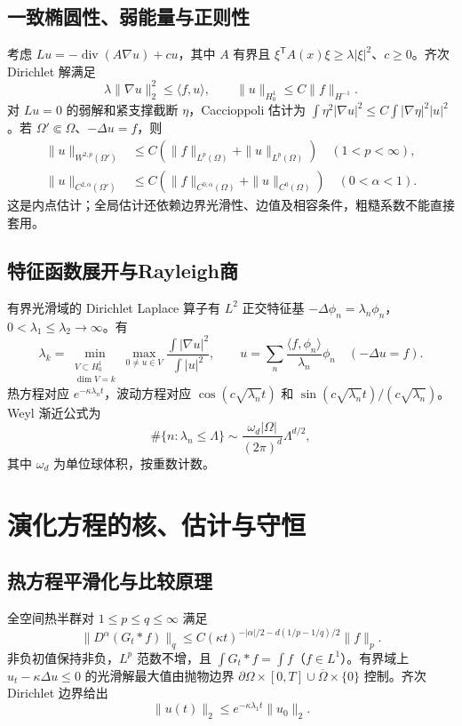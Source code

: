 \documentclass[../main.tex]{subfiles}
\begin{document}
\subsection{一致椭圆性、弱能量与正则性}
考虑 $Lu=-\operatorname{div}(A\nabla u)+cu$，其中 $A$ 有界且 $\xi^{\mathsf T}A(x)\xi\ge\lambda|\xi|^2$、$c\ge0$。齐次 Dirichlet 解满足
\[
\lambda\|\nabla u\|_2^2\le\langle f,u\rangle,\qquad
\|u\|_{H_0^1}\le C\|f\|_{H^{-1}}.
\]
对 $Lu=0$ 的弱解和紧支撑截断 $\eta$，Caccioppoli 估计为 $\int\eta^2|\nabla u|^2\le C\int|\nabla\eta|^2|u|^2$。若 $\Omega'\Subset\Omega$、$-\Delta u=f$，则
\begin{align*}
\|u\|_{W^{2,p}(\Omega')}&\le C(\|f\|_{L^p(\Omega)}+\|u\|_{L^p(\Omega)})\quad(1<p<\infty),\\
\|u\|_{C^{2,\alpha}(\Omega')}&\le C(\|f\|_{C^{0,\alpha}(\Omega)}+\|u\|_{C^0(\Omega)})\quad(0<\alpha<1).
\end{align*}
这是内点估计；全局估计还依赖边界光滑性、边值及相容条件，粗糙系数不能直接套用。
\subsection{特征函数展开与Rayleigh商}
有界光滑域的 Dirichlet Laplace 算子有 $L^2$ 正交特征基 $-\Delta\phi_n=\lambda_n\phi_n$，$0<\lambda_1\le\lambda_2\to\infty$。有
\[
\lambda_k=\min_{\substack{V\subset H_0^1\\\dim V=k}}\max_{0\ne u\in V}
\frac{\int|\nabla u|^2}{\int|u|^2},\qquad
u=\sum_n\frac{\langle f,\phi_n\rangle}{\lambda_n}\phi_n\quad(-\Delta u=f).
\]
热方程对应 $e^{-\kappa\lambda_nt}$，波动方程对应 $\cos(c\sqrt{\lambda_n}t)$ 和 $\sin(c\sqrt{\lambda_n}t)/(c\sqrt{\lambda_n})$。Weyl 渐近公式为
\[
\#\{n:\lambda_n\le\Lambda\}\sim\frac{\omega_d|\Omega|}{(2\pi)^d}\Lambda^{d/2},
\]
其中 $\omega_d$ 为单位球体积，按重数计数。
\section{演化方程的核、估计与守恒}
\subsection{热方程平滑化与比较原理}
全空间热半群对 $1\le p\le q\le\infty$ 满足
\[
\|D^\alpha(G_t*f)\|_q
\le C(\kappa t)^{-|\alpha|/2-d(1/p-1/q)/2}\|f\|_p.
\]
非负初值保持非负，$L^p$ 范数不增，且 $\int G_t*f=\int f$（$f\in L^1$）。有界域上 $u_t-\kappa\Delta u\le0$ 的光滑解最大值由抛物边界 $\partial\Omega\times[0,T]\cup\overline\Omega\times\{0\}$ 控制。齐次 Dirichlet 边界给出
\[
\|u(t)\|_2\le e^{-\kappa\lambda_1t}\|u_0\|_2.
\]
\end{document}
